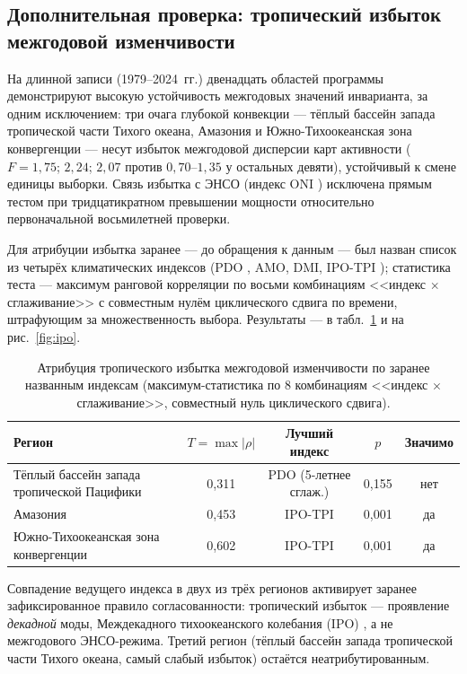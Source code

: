 \documentclass[11pt,a4paper]{article}
\begin{document}
\subsection{Дополнительная проверка: тропический избыток межгодовой изменчивости}
\label{sec:ipo}

На длинной записи (1979--2024~гг.) двенадцать областей программы демонстрируют высокую устойчивость межгодовых значений инварианта, за одним исключением: три очага глубокой конвекции --- тёплый бассейн запада тропической части Тихого океана, Амазония и Южно-Тихоокеанская зона конвергенции --- несут избыток межгодовой дисперсии карт активности ($F=1{,}75$; $2{,}24$; $2{,}07$ против $0{,}70$--$1{,}35$ у остальных девяти), устойчивый к смене единицы выборки. Связь избытка с ЭНСО (индекс ONI \cite{Trenberth1997}) исключена прямым тестом при тридцатикратном превышении мощности относительно первоначальной восьмилетней проверки.

Для атрибуции избытка заранее --- до обращения к данным --- был назван список из четырёх климатических индексов (PDO \cite{Newman2016}, AMO, DMI, IPO-TPI \cite{Henley2015}); статистика теста --- максимум ранговой корреляции по восьми комбинациям <<индекс $\times$ сглаживание>> с совместным нулём циклического сдвига по времени, штрафующим за множественность выбора. Результаты --- в табл.~\ref{tab:ipo} и на рис.~\ref{fig:ipo}.

\begin{table}[t]
\centering
\caption{Атрибуция тропического избытка межгодовой изменчивости по заранее названным индексам (максимум-статистика по 8 комбинациям <<индекс $\times$ сглаживание>>, совместный нуль циклического сдвига).}
\label{tab:ipo}
\small
\begin{tabular}{@{}lcccc@{}}
\toprule
Регион & $T=\max\lvert\rho\rvert$ & Лучший индекс & $p$ & Значимо\\
\midrule
Тёплый бассейн запада тропической Пацифики & 0,311 & PDO (5-летнее сглаж.) & 0,155 & нет\\
Амазония & 0,453 & IPO-TPI & 0,001 & да\\
Южно-Тихоокеанская зона конвергенции & 0,602 & IPO-TPI & 0,001 & да\\
\bottomrule
\end{tabular}
\end{table}

Совпадение ведущего индекса в двух из трёх регионов активирует заранее зафиксированное правило согласованности: тропический избыток --- проявление \emph{декадной} моды, Междекадного тихоокеанского колебания (IPO) \cite{Power1999,Henley2015}, а не межгодового ЭНСО-режима. Третий регион (тёплый бассейн запада тропической части Тихого океана, самый слабый избыток) остаётся неатрибутированным.
\end{document}
